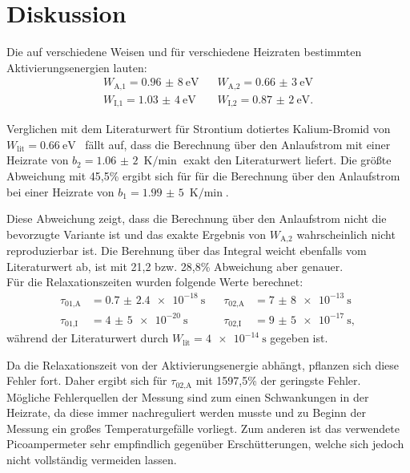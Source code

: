 \section{Diskussion}
Die auf verschiedene Weisen und für verschiedene Heizraten bestimmten Aktivierungsenergien lauten:
\begin{align*}
  W_\text{A,1}=\SI{0,96(8)}{\eV}\;\;\;&W_\text{A,2}=\SI{0,66(3)}{\eV}\\
  W_\text{I,1}=\SI{1,03(4)}{\eV}\;\;\;&W_\text{I,2}=\SI{0,87(2)}{\eV}.
\end{align*}

Verglichen mit dem Literaturwert für Strontium dotiertes
Kalium-Bromid von ${W_\text{lit}=\SI{0,66}{\eV} }$~\cite{literaturwert}
fällt auf, dass die Berechnung über den Anlaufstrom mit einer Heizrate von $b_2=\SI{1,06(2)}{\K\per\min}$
exakt den Literaturwert liefert. Die größte Abweichung mit 45,5\% ergibt sich für für die Berechnung über den
Anlaufstrom bei einer Heizrate von $b_1=\SI{1,99(5)}{\K\per\min}$.

Diese Abweichung zeigt, dass
die Berechnung über den Anlaufstrom nicht die bevorzugte Variante ist und das exakte Ergebnis von $W_\text{A,2}$
wahrscheinlich nicht reproduzierbar ist.
Die Berehnung über das Integral weicht ebenfalls vom Literaturwert ab, ist mit 21,2 bzw. 28,8\% Abweichung aber
genauer.
\\
Für die Relaxationszeiten wurden folgende Werte berechnet:
\begin{align*}
  \tau_\text{01,A}&=\SI{0.7(24)e-18}{\s}\;\;\;&\tau_\text{02,A}&=\SI{7(8)e-13}{\s}\\
  \tau_\text{01,I}&=\SI{4(5)e-20}{\s}\;\;\;&\tau_\text{02,I}&=\SI{9(5)e-17}{\s},
\end{align*}
während der Literaturwert durch $W_\text{lit}=\SI{4e-14}{\s}$ \cite{literaturwert}
gegeben ist.

Da die Relaxationszeit von der Aktivierungsenergie abhängt, pflanzen sich diese Fehler fort.
Daher ergibt sich für $\tau_\text{02,A}$ mit 1597,5\% der geringste Fehler.
\\
Mögliche Fehlerquellen der Messung sind zum einen Schwankungen in der Heizrate, da diese immer nachreguliert werden
musste und zu Beginn der Messung ein großes Temperaturgefälle vorliegt. Zum anderen ist das verwendete
Picoampermeter sehr empfindlich gegenüber Erschütterungen, welche sich jedoch nicht vollständig vermeiden lassen.
